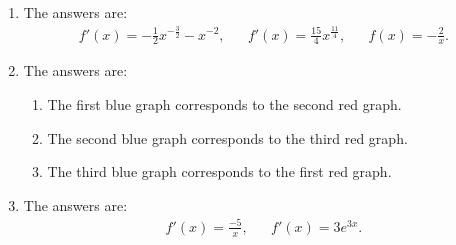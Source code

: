 \begin{enumerate}
	\item The answers are:	
	\begin{align*}
		f'(x)=-\frac{1}{2}x^{-\frac{3}{2}}-x^{-2},&& f'(x)=\frac{15}{4}x^{\frac{11}{4}},&&f(x)=-\frac{2}{x}.
	\end{align*}
	
	

	
	\item The answers are:
	\begin{enumerate}
		\item The first blue graph corresponds to the second red graph.
		\item The second blue graph corresponds to the third red graph.
		\item The third blue graph corresponds to the first red graph.
	\end{enumerate}

	
	\item The answers are:
	\begin{align*}
	f'(x)=\frac{-5}{x},&& f'(x)=3e^{3x}.
	\end{align*}
	
	\end{enumerate}